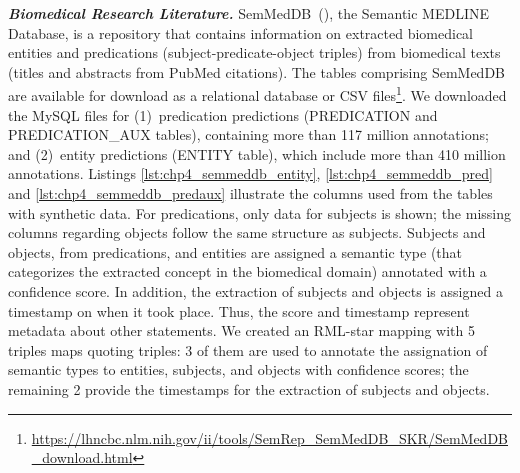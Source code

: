 

\noindent\textbf{\textit{Biomedical Research Literature.}} 
SemMedDB~(\cite{SemMedDB}), the Semantic MEDLINE Database, is a repository 
that contains information on extracted biomedical entities 
and predications (subject-predicate-object triples) 
from biomedical texts (titles and abstracts from PubMed citations). 
The tables comprising SemMedDB are available for download as a relational database or CSV files\footnote{ \url{https://lhncbc.nlm.nih.gov/ii/tools/SemRep_SemMedDB_SKR/SemMedDB_download.html}}.
We downloaded the MySQL files for (1)~predication predictions (PREDICATION and PREDICATION\_AUX tables), containing more than 117 million annotations; and (2)~entity predictions (ENTITY table), which include more than 410 million annotations.
Listings \ref{lst:chp4_semmeddb_entity}, \ref{lst:chp4_semmeddb_pred} and \ref{lst:chp4_semmeddb_predaux} illustrate the columns used from the tables with synthetic data. 
For predications, only data for subjects is shown; the missing columns regarding objects follow the same structure as subjects.
Subjects and objects, from predications, and entities are assigned a semantic type 
(that categorizes the extracted concept in the biomedical domain) annotated with a confidence score. 
In addition, the extraction of subjects and objects is assigned a timestamp on when it took place. 
Thus, the score and timestamp represent metadata about other statements.
We created an RML-star mapping with 5 triples maps quoting triples:
3 of them are used to annotate the assignation of semantic types to entities, subjects, and objects with confidence scores;
the remaining 2 provide the timestamps for the extraction of subjects and objects. 

